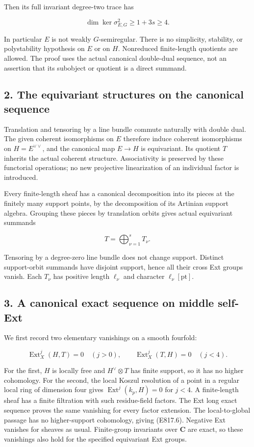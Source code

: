 Then its full invariant degree-two trace has

\[
 \dim\ker\sigma^2_{E,G}\ge1+3s\ge4.
 \tag{E817.4}
\]

In particular \(E\) is not weakly \(G\)-semiregular. There is no
simplicity, stability, or polystability hypothesis on \(E\) or on \(H\).
Nonreduced finite-length quotients are allowed. The proof uses the
actual canonical double-dual sequence, not an assertion that its
subobject or quotient is a direct summand.

\subsection{2. The equivariant structures on the canonical
sequence}\label{SF-E817-the-equivariant-structures-on-the-canonical-sequence}

Translation and tensoring by a line bundle commute naturally with double
dual. The given coherent isomorphisms on \(E\) therefore induce coherent
isomorphisms on \(H=E^{\vee\vee}\), and the canonical map \(E\to H\) is
equivariant. Its quotient \(T\) inherits the actual coherent structure.
Associativity is preserved by these functorial operations; no new
projective linearization of an individual factor is introduced.

Every finite-length sheaf has a canonical decomposition into its pieces
at the finitely many support points, by the decomposition of its
Artinian support algebra. Grouping these pieces by translation orbits
gives actual equivariant summands

\[
 T=\bigoplus_{\nu=1}^{s}T_\nu.
 \tag{E817.5}
\]

Tensoring by a degree-zero line bundle does not change support. Distinct
support-orbit summands have disjoint support, hence all their cross Ext
groups vanish. Each \(T_\nu\) has positive length \(\ell_\nu\) and
character \(\ell_\nu[\mathrm{pt}]\).

\subsection{3. A canonical exact sequence on middle
self-Ext}\label{SF-E817-a-canonical-exact-sequence-on-middle-self-ext}

We first record two elementary vanishings on a smooth fourfold:

\[
 \operatorname{Ext}^j_X(H,T)=0\quad(j>0),
 \qquad
 \operatorname{Ext}^j_X(T,H)=0\quad(j<4).
 \tag{E817.6}
\]

For the first, \(H\) is locally free and \(H^\vee\otimes T\) has finite
support, so it has no higher cohomology. For the second, the local
Koszul resolution of a point in a regular local ring of dimension four
gives \(\operatorname{Ext}^j(k_p,H)=0\) for \(j<4\). A finite-length
sheaf has a finite filtration with such residue-field factors. The Ext
long exact sequence proves the same vanishing for every factor
extension. The local-to-global passage has no higher-support cohomology,
giving (E817.6). Negative Ext vanishes for sheaves as usual.
Finite-group invariants over \(\mathbf C\) are exact, so these
vanishings also hold for the specified equivariant Ext groups.

